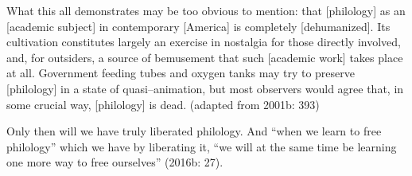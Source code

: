 \begin{myquote}
What this all demonstrates may be too obvious to mention: that [philology] as an [academic subject] in contemporary [America] is completely [dehumanized]. Its cultivation constitutes largely an exercise in nostalgia for those directly involved, and, for outsiders, a source of bemusement that such [academic work] takes place at all. Government feeding tubes and oxygen tanks may try to preserve [philology] in a state of quasi–animation, but most observers would agree that, in some crucial way, [philology] is dead. (adapted from 2001b: 393)
\end{myquote}

Only then will we have truly liberated philology. And “when we learn to free philology” which we have by liberating it, “we will at the same time be learning one more way to free ourselves” (2016b: 27).

